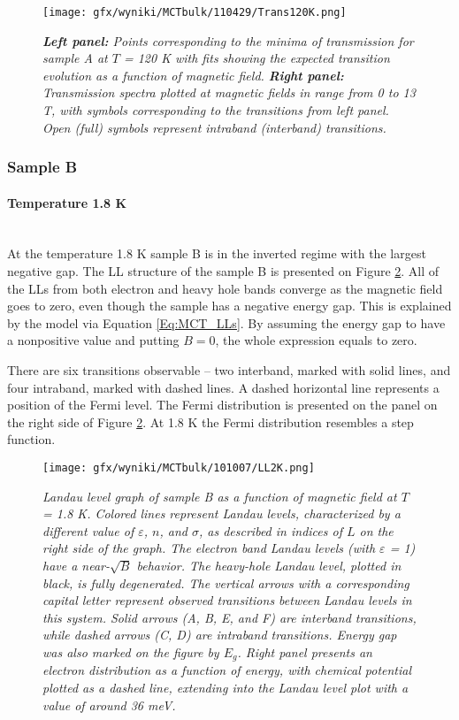 \documentclass[titlepage,a4paper]{book}
\newcommand{\wciecie}{\quad\phantom{v}}
\newcommand{\myparagraph}[1]{\paragraph{#1}\mbox{}\\}
\begin{document}
\begin{figure}[ht]
	\centering
	\texttt{[image: gfx/wyniki/MCTbulk/110429/Trans120K.png]}
	\vspace{-10pt}
	\caption{\textit{\textbf{Left panel:} Points corresponding to the minima of transmission for sample A at $T$ = 120 K with fits showing the expected transition evolution as a function of magnetic field. \textbf{Right panel:} Transmission spectra plotted at magnetic fields in range from 0 to 13 T, with symbols corresponding to the transitions from left panel. Open (full) symbols represent intraband (interband) transitions.}}
	\label{fig:Spectra_110429_120K}
\end{figure}

\clearpage
\subsubsection{Sample B}
\myparagraph{Temperature 1.8 K}
\wciecie
At the temperature 1.8 K sample B is in the inverted regime with the largest negative gap. The LL structure of the sample B is presented on Figure \ref{fig:LL_101007_2K}. All of the LLs from both electron and heavy hole bands converge as the magnetic field goes to zero, even though the sample has a negative energy gap. This is explained by the model via Equation \ref{Eq:MCT_LLs}. By assuming the energy gap to have a nonpositive value and putting $B = 0$, the whole expression equals to zero.

There are six transitions observable -- two interband, marked with solid lines, and four intraband, marked with dashed lines. A dashed horizontal line represents a position of the Fermi level. The Fermi distribution is presented on the panel on the right side of Figure \ref{fig:LL_101007_2K}. At 1.8 K the Fermi distribution resembles a step function.

\begin{figure}[ht]
	\centering
	\texttt{[image: gfx/wyniki/MCTbulk/101007/LL2K.png]}
	\vspace{-10pt}
	\caption{\textit{Landau level graph of sample B as a function of magnetic field at $T$ = 1.8 K. Colored lines represent Landau levels, characterized by a different value of $\varepsilon$, $n$, and $\sigma$, as described in indices of $L$ on the right side of the graph. The electron band Landau levels (with $\varepsilon$ = 1) have a near-$\sqrt{B}$ behavior. The heavy-hole Landau level, plotted in black, is fully degenerated. The vertical arrows with a corresponding capital letter represent observed transitions between Landau levels in this system. Solid arrows (A, B, E, and F) are interband transitions, while dashed arrows (C, D) are intraband transitions. Energy gap was also marked on the figure by $E_g$. Right panel presents an electron distribution as a function of energy, with chemical potential plotted as a dashed line, extending into the Landau level plot with a value of around 36 meV.}}
	\label{fig:LL_101007_2K}
\end{figure}
\end{document}
